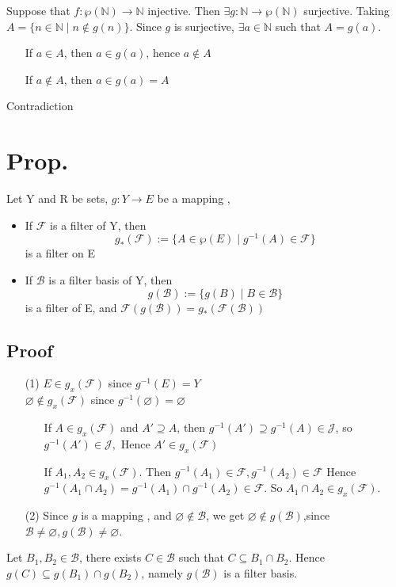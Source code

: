 \documentclass{book}
\begin{document}
Suppose that $f:\wp(\mathbb{N} )\rightarrow\mathbb{N} $ injective. Then $\exists g:\mathbb{N} \rightarrow\wp(\mathbb{N} )$ surjective. Taking $A=\{n\in \mathbb{N} \mid n\not\in g(n)\}$. Since $g$ is surjective, $\exists a\in \mathbb{N} $ such that $A=g(a)$. \begin{itemize}
    \item[If] $a\in A$, then $a\in g(a)$, hence $a\not\in A$
    \item[If] $a\not\in A$, then $a\in g(a)=A$
\end{itemize}
Contradiction
\section{Prop.}
Let Y and R be sets, $g:Y\rightarrow E$ be a mapping ,\begin{itemize}
    \item If $\mathcal{F}$ is a filter of Y, then $$g_*(\mathcal{F}):=\{A\in\wp(E)\mid g^{-1}(A)\in\mathcal{F}\}$$ is a filter on E
    \item If $\mathscr{B}$ is a filter basis of Y, then $$g(\mathscr{B}):=\{g(B)\mid B\in \mathscr{B}\}$$is a filter of E, and $\mathcal{F}(g(\mathscr{B}))=g_\ast (\mathcal{F}(\mathscr{B}))$ 
\end{itemize}
\subsection*{Proof}
\begin{itemize}
    \item [(1)]$E\in g_x(\mathcal{F})$ since $g^{-1}(E)=Y$\\$\varnothing \not\in g_x(\mathcal{F})$ since $g^{-1}(\varnothing)=\varnothing$
    \begin{itemize}
    \item [If] $A\in g_x(\mathcal{F})$ and $A'\supseteq A$, then $g^{-1}(A')\supseteq g^{-1}(A)\in\mathcal{J}$, so $g^{-1}(A')\in\mathcal{J},$ Hence $A'\in g_x(\mathcal{F})$
    \item [If] $A_1,A_2\in g_x(\mathcal{F})$. Then $g^{-1}(A_1)\in \mathcal{F},g^{-1}(A_2)\in \mathcal{F}$ Hence $g^{-1}(A_1\cap A_2)=g^{-1}(A_1)\cap g^{-1}(A_2)\in \mathcal{F}$. So $A_1\cap A_2\in g_x(\mathcal{F})$.
    \end{itemize}
    \item [(2)]Since $g$ is a mapping , and $\varnothing \not\in \mathscr{B}$, we get $\varnothing \not\in g(\mathscr{B})$,since $\mathscr{B}\not=\varnothing, g(\mathscr{B})\not=\varnothing$. 
    
\end{itemize}Let $B_1,B_2\in\mathscr{B}$, there exists $C\in \mathscr{B}$ such that $C\subseteq B_1\cap B_2$. Hence $g(C)\subseteq g(B_1)\cap g(B_2)$, namely $g(\mathscr{B})$ is a filter basis.
\end{document}
